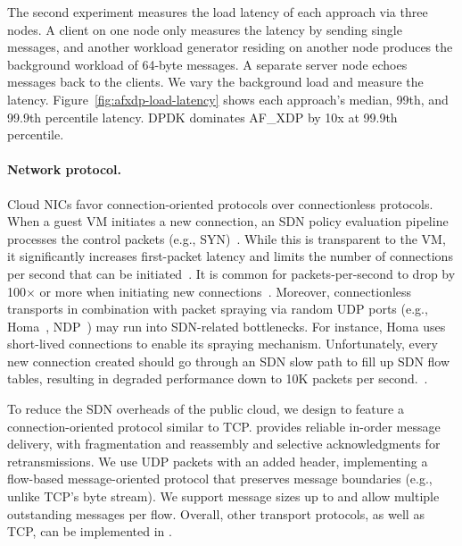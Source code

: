 The second experiment measures the load latency of each approach via three nodes.
A client on one node only measures the latency by sending single messages, and another workload generator residing on another node produces the background workload of 64-byte messages.
A separate server node echoes messages back to the clients.
We vary the background load and measure the latency.
Figure~\ref{fig:afxdp-load-latency} shows each approach's median, 99th, and 99.9th percentile latency.
DPDK dominates AF\_XDP by 10x at 99.9th percentile.

\paragraph{Network protocol.}
\label{par:network-protocol}

Cloud NICs favor connection-oriented protocols over connectionless protocols.
When a guest VM initiates a new connection, an SDN policy evaluation pipeline processes the control packets (e.g., SYN)~\cite{vfp}.
While this is transparent to the VM, it significantly increases first-packet latency and limits the number of connections per second that can be initiated~\cite{sirius, andromeda}.
It is common for packets-per-second to drop by 100$\times$ or more when initiating new connections~\cite{Bansal:nsdi23, vfp}.
Moreover, connectionless transports in combination with packet spraying via random UDP ports (e.g., Homa~\cite{homa}, NDP~\cite{NDP}) may run into SDN-related bottlenecks.
For instance, Homa uses short-lived connections to enable its spraying mechanism.
Unfortunately, every new connection created should go through an SDN slow path to fill up SDN flow tables, resulting in degraded performance down to 10K packets per second.~\cite{Bansal:nsdi23}.

To reduce the SDN overheads of the public cloud, we design \mt{} to feature a connection-oriented protocol similar to TCP.
\mt{} provides reliable in-order message delivery, with fragmentation and reassembly and selective acknowledgments for retransmissions.
We use UDP packets with an added \mt{} header, implementing a flow-based message-oriented protocol that preserves message boundaries (e.g., unlike TCP's byte stream).
We support message sizes up to  and allow multiple outstanding messages per flow.
Overall, other transport protocols, as well as TCP, can be implemented in \mt{}.


